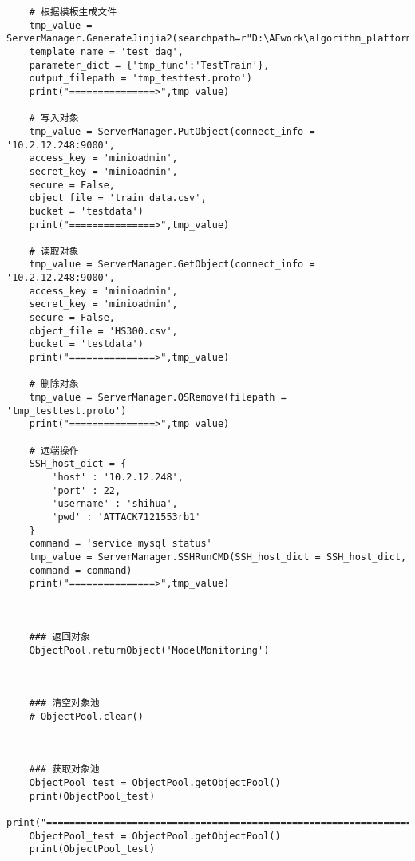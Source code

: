 \documentclass[cn,hazy,blue,14pt,screen]{elegantnote}
\begin{document}
\begin{lstlisting}
	# 根据模板生成文件                                           
	tmp_value = ServerManager.GenerateJinjia2(searchpath=r"D:\AEwork\algorithm_platform\Demo\airflow_dag",
	template_name = 'test_dag',
	parameter_dict = {'tmp_func':'TestTrain'},
	output_filepath = 'tmp_testtest.proto')
	print("===============>",tmp_value)
	
	# 写入对象
	tmp_value = ServerManager.PutObject(connect_info = '10.2.12.248:9000',
	access_key = 'minioadmin',
	secret_key = 'minioadmin',
	secure = False,
	object_file = 'train_data.csv',
	bucket = 'testdata')
	print("===============>",tmp_value)
	
	# 读取对象
	tmp_value = ServerManager.GetObject(connect_info = '10.2.12.248:9000',
	access_key = 'minioadmin',
	secret_key = 'minioadmin',
	secure = False,
	object_file = 'HS300.csv',
	bucket = 'testdata')
	print("===============>",tmp_value)
	
	# 删除对象
	tmp_value = ServerManager.OSRemove(filepath = 'tmp_testtest.proto')
	print("===============>",tmp_value)
	
	# 远端操作
	SSH_host_dict = {
		'host' : '10.2.12.248',
		'port' : 22,
		'username' : 'shihua',
		'pwd' : 'ATTACK7121553rb1'
	}
	command = 'service mysql status'
	tmp_value = ServerManager.SSHRunCMD(SSH_host_dict = SSH_host_dict,
	command = command)
	print("===============>",tmp_value)
	
	
	
	### 返回对象
	ObjectPool.returnObject('ModelMonitoring')
	
	
	
	### 清空对象池
	# ObjectPool.clear()
	
	
	
	### 获取对象池
	ObjectPool_test = ObjectPool.getObjectPool()
	print(ObjectPool_test)
	print("=========================================================================================")
	ObjectPool_test = ObjectPool.getObjectPool()
	print(ObjectPool_test)
\end{lstlisting}
\end{document}
